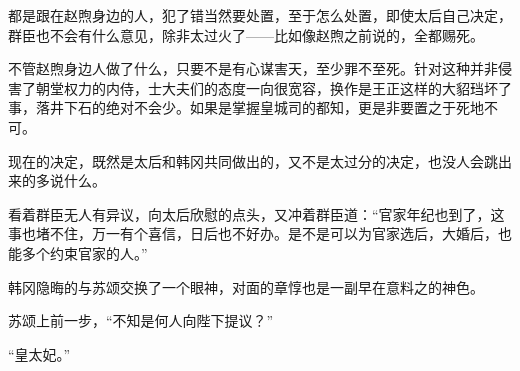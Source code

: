 都是跟在赵煦身边的人，犯了错当然要处置，至于怎么处置，即使太后自己决定，群臣也不会有什么意见，除非太过火了——比如像赵煦之前说的，全都赐死。

不管赵煦身边人做了什么，只要不是有心谋害天，至少罪不至死。针对这种并非侵害了朝堂权力的内侍，士大夫们的态度一向很宽容，换作是王正这样的大貂珰坏了事，落井下石的绝对不会少。如果是掌握皇城司的都知，更是非要置之于死地不可。

现在的决定，既然是太后和韩冈共同做出的，又不是太过分的决定，也没人会跳出来的多说什么。

看着群臣无人有异议，向太后欣慰的点头，又冲着群臣道：“官家年纪也到了，这事也堵不住，万一有个喜信，日后也不好办。是不是可以为官家选后，大婚后，也能多个约束官家的人。”

韩冈隐晦的与苏颂交换了一个眼神，对面的章惇也是一副早在意料之的神色。

苏颂上前一步，“不知是何人向陛下提议？”

“皇太妃。”
